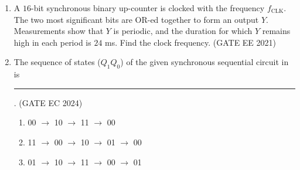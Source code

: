 \begin{enumerate}[label=\arabic*.,ref=\theenumi]
\begin{figure}[H]
		\label{fig:tff1}
	\end{figure}

\item A $16$-bit synchronous binary up-counter is clocked with the frequency $f_{\text{CLK}}$. The two most significant bits are OR-ed together to form an output $Y$. Measurements show that $Y$ is periodic, and the duration for which $Y$ remains high in each period is $24$ ms. Find the clock frequency.
	\hfill (GATE EE 2021)
\item 
The sequence of states ($Q_1Q_0$) of the given synchronous sequential circuit 
		in 
is \rule{1cm}{0.1pt}.
\hfill (GATE EC 2024)
%
	\begin{figure}[H]
    \centering
    \resizebox{0.75\columnwidth}{!}{%

		}
		\caption{}
		\label{fig:2024}
	\end{figure}
%
\begin{enumerate}
    \item 00 $\to$ 10 $\to$ 11 $\to$ 00
    \item 11 $\to$ 00 $\to$ 10 $\to$ 01 $\to$ 00
    \item 01 $\to$ 10 $\to$ 11 $\to$ 00 $\to$ 01

\end{enumerate}
\end{enumerate}
